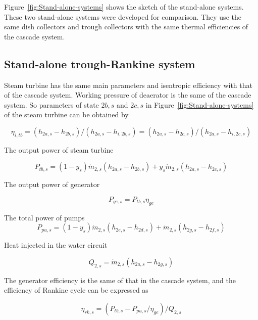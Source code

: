 Figure~\ref{fig:Stand-alone-systems} shows the sketch of the stand-alone systems. These two stand-alone systems were developed for comparison. They use the same dish collectors and trough collectors with the same thermal efficiencies of the cascade system.

\subsection{Stand-alone trough-Rankine system}

Steam turbine has the same main parameters and isentropic efficiency with that of the cascade system. Working pressure of deaerator is the same of the cascade system. So parameters of state $2b,s$ and $2c,s$ in Figure~\ref{fig:Stand-alone-systems} of the steam turbine can be obtained by

\begin{equation}
	\eta_{i,tb}= (h_{2a,s}-h_{2b,s})/(h_{2a,s}-h_{i,2b,s}) = (h_{2a,s}-h_{2c,s})/(h_{2a,s}-h_{i,2c,s})
\end{equation}

The output power of steam turbine

\begin{equation}
	P_{tb,s}=\left(1-y_{s}\right)\dot{m}_{2,s}\left(h_{2a,s}-h_{2b,s}\right)+y_{s}\dot{m}_{2,s}\left(h_{2a,s}-h_{2c,s}\right)
\end{equation}

The output power of generator

\begin{equation}
	P_{ge,s}=P_{tb,s}\eta_{ge}
\end{equation}

The total power of pumps
\begin{equation}
	P_{pu,s}=\left(1-y_{s}\right)\dot{m}_{2,s}\left(h_{2e,s}-h_{2d,s}\right)+\dot{m}_{2,s}\left(h_{2g,s}-h_{2f,s}\right)
\end{equation}

Heat injected in the water circuit

\begin{equation}
	Q_{2,s}=\dot{m}_{2,s}\left(h_{2a,s}-h_{2g,s}\right)
\end{equation}

The generator efficiency is the same of that in the cascade system, and the efficiency of Rankine cycle can be expressed as

\begin{equation}
	\eta_{rk,s}=(P_{tb,s}-P_{pu,s}/\eta_{ge})/Q_{2,s}
\end{equation}

